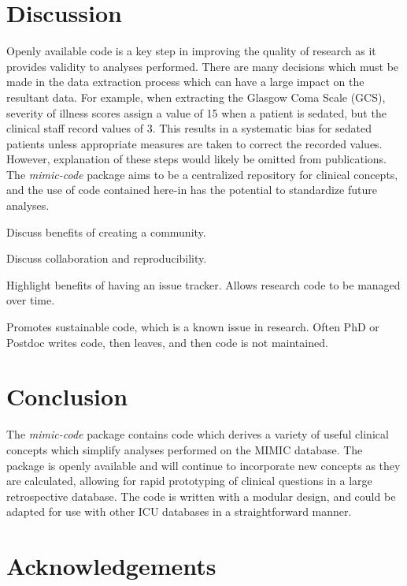 \documentclass{bioinfo}
\begin{document}

\section{Discussion}

Openly available code is a key step in improving the quality of research as it provides validity to analyses performed. There are many decisions which must be made in the data extraction process which can have a large impact on the resultant data. For example, when extracting the Glasgow Coma Scale (GCS), severity of illness scores assign a value of 15 when a patient is sedated, but the clinical staff record values of 3. This results in a systematic bias for sedated patients unless appropriate measures are taken to correct the recorded values. However, explanation of these steps would likely be omitted from publications. The \emph{mimic-code} package aims to be a centralized repository for clinical concepts, and the use of code contained here-in has the potential to standardize future analyses.

Discuss benefits of creating a community.

Discuss collaboration and reproducibility.

Highlight benefits of having an issue tracker. Allows research code to be managed over time. 

Promotes sustainable code, which is a known issue in research. Often PhD or Postdoc writes code, then leaves, and then code is not maintained.

\section{Conclusion}

The \emph{mimic-code} package contains code which derives a variety of useful clinical concepts which simplify analyses performed on the MIMIC database. The package is openly available and will continue to incorporate new concepts as they are calculated, allowing for rapid prototyping of clinical questions in a large retrospective database. The code is written with a modular design, and could be adapted for use with other ICU databases in a straightforward manner.  \\

\section*{Acknowledgements}
\end{document}
